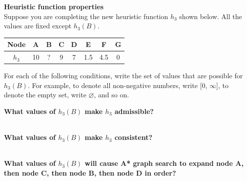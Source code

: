 \begin{question}[] \textbf{Heuristic function properties}\\
Suppose you are completing the new heuristic function $h_3$ shown below.
All the values are fixed except $h_3(B)$.  


\begin{center}

\begin{tabular}{|c|c|c|c|c|c|c|c|}
\hline
Node & A & B & C & D & E & F & G \\
\hline
$h_3$& 10 & ?  & 9 & 7 & 1.5 & 4.5& 0 \\
\hline
\end{tabular}
\end{center}

For each of the following conditions, write the set
of values that are possible for $h_3(B)$.
For example, to denote all non-negative numbers, write [0, $\infty$], to denote the empty set, write $\varnothing$, and so on.

\vspace{0.5 cm}
\begin{subquestion}[2]
\textbf{What values of $h_3(B)$ make $h_3$ admissible?} \\
\fbox{\begin{minipage}[t][2cm][t]{13cm} \AnswerTwoBi \end{minipage}} \\

\end{subquestion}

\begin{subquestion}[3]
\textbf{What values of $h_3(B)$ make $h_3$ consistent?} \\
\fbox{\begin{minipage}[t][2cm][t]{13cm} \AnswerTwoBii \end{minipage}} \\


\end{subquestion}

\begin{subquestion}[4]
\textbf{What values of $h_3(B)$ will cause A* graph search to expand node A, then node C, then node B, then node D in order?} \\
\fbox{\begin{minipage}[t][2cm][t]{13cm} \AnswerTwoBiii \end{minipage}} \\

\end{subquestion}

\end{question}








